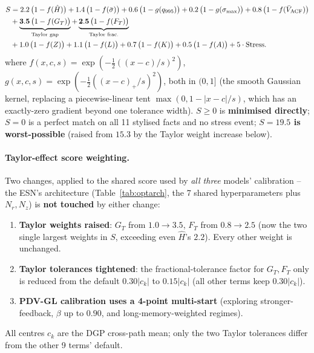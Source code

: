 \documentclass[11pt,a4paper]{article}
\begin{document}
\begin{equation}
\begin{aligned}
S &= 2.2\,\bigl(1-f(\hat H)\bigr)+1.4\,\bigl(1-f(\bar\sigma)\bigr)+0.6\,\bigl(1-g(q_{995})\bigr)+0.2\,\bigl(1-g(\sigma_{\max})\bigr)
   +0.8\,\bigl(1-f(\bar V_{\rm ACF})\bigr)\\
  &+\underbrace{\mathbf{3.5}\,\bigl(1-f(G_T)\bigr)}_{\text{Taylor gap}}
   +\underbrace{\mathbf{2.5}\,\bigl(1-f(F_T)\bigr)}_{\text{Taylor frac.}}\\
  &+1.0\,\bigl(1-f(Z)\bigr)+1.1\,\bigl(1-f(L)\bigr)+0.7\,\bigl(1-f(K)\bigr)+0.5\,\bigl(1-f(A)\bigr)+5\cdot\mathrm{Stress}.
\end{aligned}
\label{eq:score}
\end{equation}
where $f(x,c,s)=\exp(-\tfrac12((x-c)/s)^2)$,
$g(x,c,s)=\exp(-\tfrac12((x-c)_+/s)^2)$, both in $(0,1]$ (the smooth
Gaussian kernel, replacing a piecewise-linear
tent $\max(0,1-|x-c|/s)$, which has an exactly-zero gradient beyond one
tolerance width). $S\geq0$ is \textbf{minimised directly}; $S=0$ is a
perfect match on all 11 stylised facts and no stress event;
\textbf{$S=19.5$ is worst-possible} (raised from $15.3$ by the Taylor
weight increase below).

\paragraph{Taylor-effect score weighting.} Two changes, applied to the
shared score used by \emph{all three} models' calibration -- the ESN's
architecture (Table~\ref{tab:optarch}, the 7 shared hyperparameters plus
$N_r,N_z$) is \textbf{not touched} by either change:
\begin{enumerate}[itemsep=2pt]
  \item \textbf{Taylor weights raised}: $G_T$ from $1.0\to3.5$, $F_T$
    from $0.8\to2.5$ (now the two single largest weights in $S$,
    exceeding even $\hat H$'s $2.2$). Every other weight is unchanged.
  \item \textbf{Taylor tolerances tightened}: the fractional-tolerance
    factor for $G_T,F_T$ only is reduced from the default $0.30|c_k|$
    to $0.15|c_k|$ (all other terms keep $0.30|c_k|$).
  \item \textbf{PDV-GL calibration uses a 4-point multi-start}
    (exploring stronger-feedback, $\beta$ up to $0.90$, and
    long-memory-weighted regimes).
\end{enumerate}
All centres $c_k$ are the DGP cross-path mean; only the two Taylor
tolerances differ from the other 9 terms' default.
\end{document}
